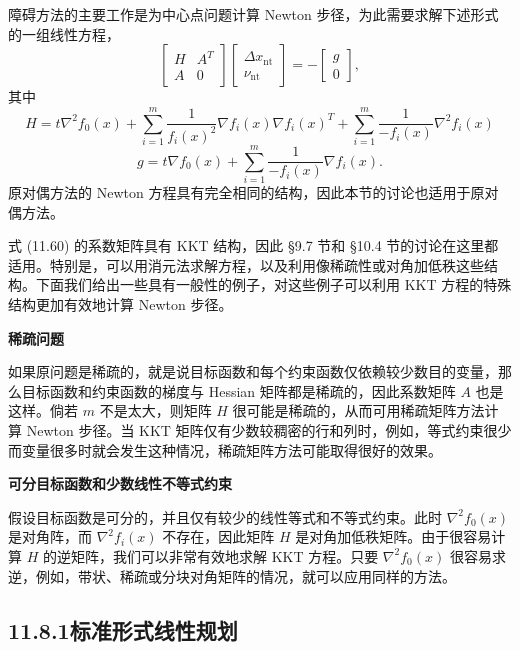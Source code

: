 \documentclass[UTF8,12pt,a4paper,fontset=fandol]{ctexart}
\begin{document}
障碍方法的主要工作是为中心点问题计算 Newton 步径，为此需要求解下述形式的一组线性方程，
\begin{equation}
\begin{bmatrix}
H & A^T\\
A & 0
\end{bmatrix}
\begin{bmatrix}
\Delta x_{\mathrm{nt}}\\
\nu_{\mathrm{nt}}
\end{bmatrix}
=-
\begin{bmatrix}
g\\
0
\end{bmatrix},
\tag{11.60}
\end{equation}
其中
\[
H=t\nabla^2f_0(x)+\sum_{i=1}^m\frac{1}{f_i(x)^2}\nabla f_i(x)\nabla f_i(x)^T+\sum_{i=1}^m\frac{1}{-f_i(x)}\nabla^2f_i(x)
\]
\[
g=t\nabla f_0(x)+\sum_{i=1}^m\frac{1}{-f_i(x)}\nabla f_i(x).
\]
原对偶方法的 Newton 方程具有完全相同的结构，因此本节的讨论也适用于原对偶方法。

式 (11.60) 的系数矩阵具有 KKT 结构，因此 \S 9.7 节和 \S 10.4 节的讨论在这里都适用。特别是，可以用消元法求解方程，以及利用像稀疏性或对角加低秩这些结构。下面我们给出一些具有一般性的例子，对这些例子可以利用 KKT 方程的特殊结构更加有效地计算 Newton 步径。

\noindent\textbf{稀疏问题}

如果原问题是稀疏的，就是说目标函数和每个约束函数仅依赖较少数目的变量，那么目标函数和约束函数的梯度与 Hessian 矩阵都是稀疏的，因此系数矩阵 $A$ 也是这样。倘若 $m$ 不是太大，则矩阵 $H$ 很可能是稀疏的，从而可用稀疏矩阵方法计算 Newton 步径。当 KKT 矩阵仅有少数较稠密的行和列时，例如，等式约束很少而变量很多时就会发生这种情况，稀疏矩阵方法可能取得很好的效果。

\noindent\textbf{可分目标函数和少数线性不等式约束}

假设目标函数是可分的，并且仅有较少的线性等式和不等式约束。此时 $\nabla^2f_0(x)$ 是对角阵，而 $\nabla^2f_i(x)$ 不存在，因此矩阵 $H$ 是对角加低秩矩阵。由于很容易计算 $H$ 的逆矩阵，我们可以非常有效地求解 KKT 方程。只要 $\nabla^2f_0(x)$ 很容易求逆，例如，带状、稀疏或分块对角矩阵的情况，就可以应用同样的方法。

\subsection*{11.8.1\quad 标准形式线性规划}
\end{document}

